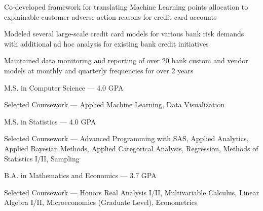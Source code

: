 \documentclass{resume}
\begin{document}
\begin{experience}
    \begin{description}
        \item Co-developed framework for translating Machine Learning points allocation to explainable customer adverse action reasons for credit card accounts
        \item Modeled several large-scale credit card models for various bank risk demands with additional ad hoc analysis for existing bank credit initiatives
        \item Maintained data monitoring and reporting of over 20 bank custom and vendor models at monthly and quarterly frequencies for over 2 years
    \end{description}
\end{experience}

\begin{education}
    \begin{description}
        \item M.S. in Computer Science --- 4.0 GPA
        \item Selected Coursework ---
	Applied Machine Learning, 
	Data Visualization
    \end{description}

    \begin{description}
        \item M.S. in Statistics --- 4.0 GPA
        \item Selected Coursework ---
            Advanced Programming with SAS, 
	   Applied Analytics, 
	Applied Bayesian Methods, 
	Applied Categorical Analysis, 
	Regression, 
	Methods of Statistics I/II,
	Sampling
    \end{description}
    
    \begin{description}
        \item B.A. in Mathematics and Economics --- 3.7 GPA
        \item Selected Coursework ---
            Honors Real Analysis I/II, 
            Multivariable Calculus, 
            Linear Algebra I/II, Microeconomics (Graduate Level), 
            Econometrics
    \end{description}  
\end{education}
\end{document}
